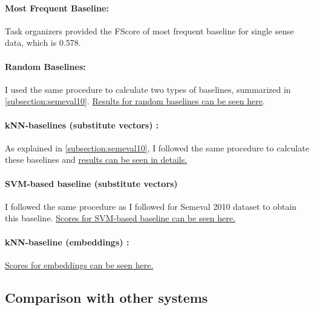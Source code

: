 \paragraph{Most Frequent Baseline:} Task organizers provided the FScore of most frequent baseline for single sense data, which is 0.578.
\paragraph{Random Baselines:} I used the same procedure to calculate two types of baselines, summarized in \ref{subsection:semeval10}.  \href{http://goo.gl/f2X0da}{Results for random baselines can be seen here}.
\paragraph{kNN-baselines (substitute vectors) :} As explained in \ref{subsection:semeval10}, I followed the same procedure to calculate these baselines and \href{http://goo.gl/J88G7R}{results can be seen in details.}
\paragraph{SVM-based baseline (substitute vectors)} I followed the same procedure as I followed for Semeval 2010 dataset to obtain this baseline. \href{https://goo.gl/010sp5}{Scores for SVM-based baseline can be seen here.}
\paragraph{kNN-baseline (embeddings) :} \href{https://goo.gl/c8F92N}{Scores for embeddings can be seen here.} 

 
\subsection{Comparison with other systems}